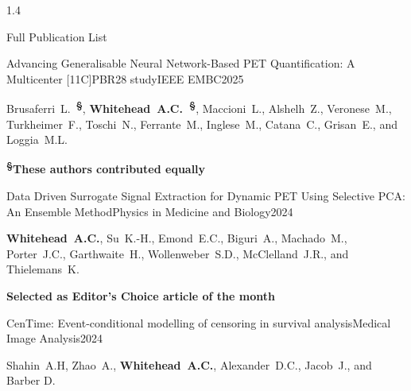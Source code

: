 \documentclass{cv}
\begin{document}
\begin{spacing}{1.4}
\begin{rSection}{Full Publication List}
            \vspace{-0.5cm}
            \item \begin{rSubsection}{Advancing Generalisable Neural Network-Based PET Quantification: A Multicenter [11C]PBR28 study}{}{IEEE EMBC}{2025}
                \vspace{-0.25cm}
                \item Brusaferri~L.~\textbf{\textsuperscript{\S}}, \textbf{Whitehead~A.C.~\textsuperscript{\S}}, Maccioni~L., Alshelh~Z., Veronese~M., Turkheimer~F., Toschi~N., Ferrante~M., Inglese~M., Catana~C., Grisan~E., and Loggia~M.L. \\
                \vspace{-0.5cm}
                \item \textbf{\textsuperscript{\S}These authors contributed equally} \\
            \end{rSubsection}
    
            \vspace{-0.5cm}
            \item \begin{rSubsection}{Data Driven Surrogate Signal Extraction for Dynamic PET Using Selective PCA: An Ensemble Method}{}{Physics in Medicine and Biology}{2024}
                \vspace{-0.25cm}
                \item \textbf{Whitehead~A.C.}, Su~K.-H., Emond~E.C., Biguri~A., Machado~M., Porter~J.C., Garthwaite~H., Wollenweber~S.D., McClelland~J.R., and Thielemans~K. \\
                \vspace{-0.5cm}
                \item \textbf{Selected as Editor’s Choice article of the month} \\
            \end{rSubsection}
    
            \vspace{-0.5cm}
            \item \begin{rSubsection}{CenTime: Event-conditional modelling of censoring in survival analysis}{}{Medical Image Analysis}{2024}
                \vspace{-0.25cm}
                \item Shahin~A.H, Zhao~A., \textbf{Whitehead~A.C.}, Alexander~D.C., Jacob~J., and Barber D.
            \end{rSubsection}
    

\end{rSection}
\end{spacing}
\end{document}
